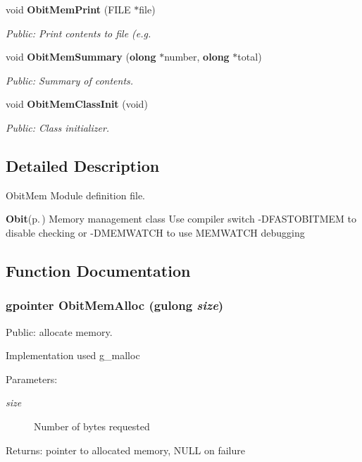 \begin{CompactItemize}
void {\bf Obit\-Mem\-Print} (FILE $\ast$file)
\begin{CompactList}\small\item\em Public: Print contents to file (e.g. \item\end{CompactList}\item 
void {\bf Obit\-Mem\-Summary} ({\bf olong} $\ast$number, {\bf olong} $\ast$total)
\begin{CompactList}\small\item\em Public: Summary of contents. \item\end{CompactList}\item 
void {\bf Obit\-Mem\-Class\-Init} (void)
\begin{CompactList}\small\item\em Public: Class initializer. \item\end{CompactList}\end{CompactItemize}


\subsection{Detailed Description}
Obit\-Mem Module definition file. 

{\bf Obit}{\rm (p.\,\pageref{structObit})} Memory management class Use compiler switch -DFASTOBITMEM to disable checking or -DMEMWATCH to use MEMWATCH debugging

\subsection{Function Documentation}
\subsubsection{\setlength{\rightskip}{0pt plus 5cm}gpointer Obit\-Mem\-Alloc (gulong {\em size})}\label{ObitMem_8c_a10}


Public: allocate memory. 

Implementation used g\_\-malloc \begin{Desc}
\item[Parameters:]
\begin{description}
\item[{\em size}]Number of bytes requested \end{description}
\end{Desc}
\begin{Desc}
\item[Returns:]pointer to allocated memory, NULL on failure \end{Desc}
